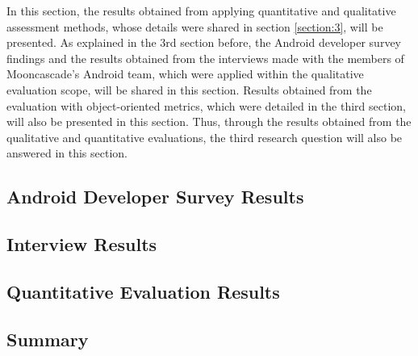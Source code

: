 In this section, the results obtained from applying quantitative and qualitative assessment methods, whose details were shared in section \ref{section:3}, will be presented. As explained in the 3rd section before, the Android developer survey findings and the results obtained from the interviews made with the members of Mooncascade's Android team, which were applied within the qualitative evaluation scope, will be shared in this section. Results obtained from the evaluation with object-oriented metrics, which were detailed in the third section, will also be presented in this section. Thus, through the results obtained from the qualitative and quantitative evaluations, the third research question will also be answered in this section.

\subsection{Android Developer Survey Results}


\subsection{Interview Results}


\subsection{Quantitative Evaluation Results}


\subsection{Summary}
